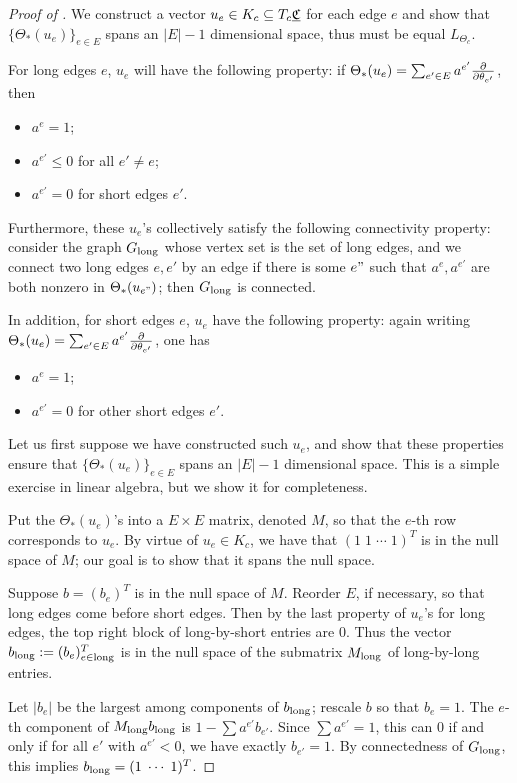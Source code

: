 \begin{proof}[Proof of ]
We construct a vector $u_e \in K_c \subseteq T_c {\underline{\mathfrak{C}}}$ for each edge $e$
and show that $\{\Theta_*(u_e)\}_{e\in E}$ spans an
$|E|-1$ dimensional space,
thus must be equal $L_{\Theta_c}$.


For long edges $e$, $u_e$ will have the following property:
if $\Theta_*(u_e) = \sum_{e' \in E} a^{e'} {\frac{\partial}{\partial \theta_{e'}}}$, then
\begin{itemize}
	\item $a^e = 1$;
	\item $a^{e'} \leq 0$ for all $e' \neq e$;
	\item $a^{e'} = 0$ for short edges $e'$.
\end{itemize}
Furthermore, these $u_e$'s collectively satisfy the following
connectivity property:
consider the graph $G_{\text{long}}$ whose vertex set is the set of long edges,
and we connect two long edges $e,e'$ by an edge if there is some $e"$ such that
$a^e, a^{e'}$ are both nonzero in $\Theta_*(u_{e"})$;
then $G_{\text{long}}$ is connected.

In addition, for short edges $e$,
$u_e$ have the following property: again writing
$\Theta_*(u_e) = \sum_{e' \in E} a^{e'} {\frac{\partial}{\partial \theta_{e'}}}$,
one has
\begin{itemize}
	\item $a^e = 1$;
	\item $a^{e'} = 0$ for other short edges $e'$.
\end{itemize}


Let us first suppose we have constructed such $u_e$,
and show that these properties ensure that
$\{\Theta_*(u_e)\}_{e\in E}$ spans an $|E|-1$ dimensional space.
This is a simple exercise in linear algebra,
but we show it for completeness.


Put the $\Theta_*(u_e)$'s into a $E \times E$ matrix,
denoted $M$,
so that the $e$-th row corresponds to $u_e$.
By virtue of $u_e \in K_c$, we have that $(1\; 1\; \cdots \; 1)^T$
is in the null space of $M$;
our goal is to show that it spans the null space.


Suppose $b = (b_e)^T$ is in the null space of $M$.
Reorder $E$, if necessary, so that long edges come before
short edges.
Then by the last property of $u_e$'s for long edges,
the top right block of long-by-short entries are 0.
Thus the vector $b_{\text{long}} := (b_e)_{e \in {\text{long}}}^T$ is in the null space
of the submatrix $M_{\text{long}}$ of long-by-long entries.


Let $|b_e|$ be the largest among components of $b_{\text{long}}$;
rescale $b$ so that $b_e = 1$.
The $e$-th component of $M_{\text{long}} b_{\text{long}}$
is $1 - \sum a^{e'} b_{e'}$.
Since $\sum a^{e'} = 1$, this can 0 if and only if
for all $e'$ with $a^{e'} < 0$, we have exactly $b_{e'} = 1$.
By connectedness of $G_{\text{long}}$, this implies
$b_{\text{long}} = (1 \; \cdots \; 1)^T$.



\end{proof}
